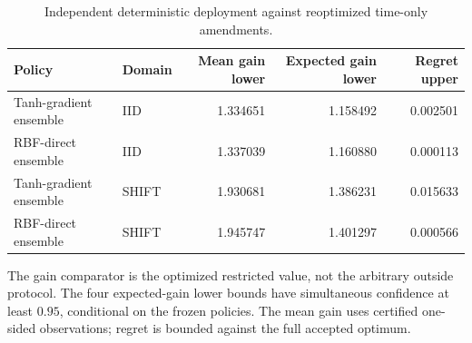 \begin{table}[tbp]\centering\small
\caption{Independent deterministic deployment against reoptimized time-only amendments.}\label{tab:r22-validation}
\begin{tabular}{llrrr}
\toprule
Policy & Domain & Mean gain lower & Expected gain lower & Regret upper\\
\midrule
Tanh-gradient ensemble & IID & 1.334651 & 1.158492 & 0.002501\\
RBF-direct ensemble & IID & 1.337039 & 1.160880 & 0.000113\\
Tanh-gradient ensemble & SHIFT & 1.930681 & 1.386231 & 0.015633\\
RBF-direct ensemble & SHIFT & 1.945747 & 1.401297 & 0.000566\\
\bottomrule
\end{tabular}
\par\smallskip\begin{minipage}{.98\textwidth}\small The gain comparator is the optimized restricted value, not the arbitrary outside protocol. The four expected-gain lower bounds have simultaneous confidence at least $0.95$, conditional on the frozen policies. The mean gain uses certified one-sided observations; regret is bounded against the full accepted optimum.\end{minipage}
\end{table}
